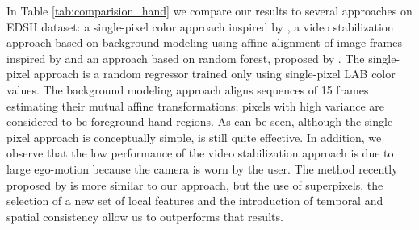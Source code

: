 In Table \ref{tab:comparision_hand} we compare our results to several approaches on EDSH dataset: a single-pixel color approach inspired by \cite{jones99}, a video stabilization approach based on background modeling using affine alignment of image frames inspired by
\cite{hayman03} and an approach based on random forest, proposed by \cite{li13}. 
The single-pixel approach is a random regressor trained only using single-pixel LAB color values. 
The background modeling approach aligns sequences of 15 frames estimating their mutual affine transformations; pixels with high variance are considered to be foreground hand regions. 
As can be seen, although the single-pixel approach is conceptually simple, is still quite effective. In addition, we observe that the low performance of the video stabilization approach is due to large ego-motion because the camera is worn by the user.     
The method recently proposed by \cite{li13} is more similar to our approach, but the use of superpixels, the selection of a new set of local features and the introduction of temporal and spatial consistency allow us to outperforms that results.
